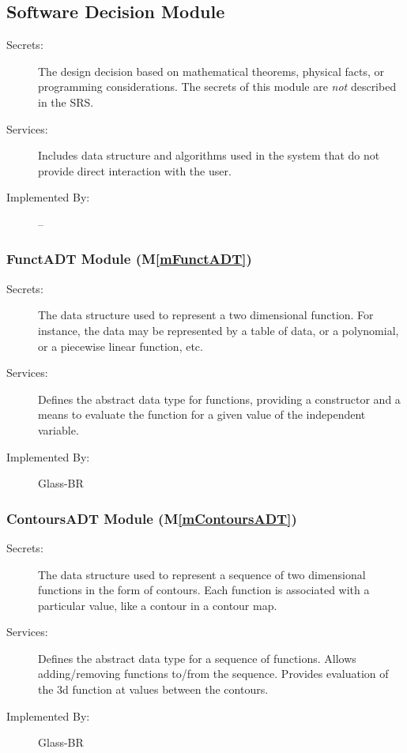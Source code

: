 \documentclass[12pt]{article}
\newcommand{\mref}[1]{M\ref{#1}}
\begin{document}
\subsection{Software Decision Module}

\begin{description}
\item[Secrets:] The design decision based on mathematical theorems, physical
  facts, or programming considerations. The secrets of this module are
  \emph{not} described in the SRS.
\item[Services:] Includes data structure and algorithms used in the system that
  do not provide direct interaction with the user. 
\item[Implemented By:] --
\end{description}

\subsubsection{FunctADT Module (\mref{mFunctADT})}

\begin{description}
\item[Secrets:] The data structure used to represent a two dimensional
  function.  For instance, the data may be represented by a table of data, or a
  polynomial, or a piecewise linear function, etc.
\item[Services:] Defines the abstract data type for functions, providing a
  constructor and a means to evaluate the function for a given value of the
  independent variable.
\item[Implemented By:] Glass-BR
\end{description}

\subsubsection{ContoursADT Module (\mref{mContoursADT})}

\begin{description}
\item[Secrets:] The data structure used to represent a
  sequence of two dimensional functions in the form of contours.  Each function
  is associated with a particular value, like a contour in a contour map.
\item[Services:] Defines the abstract data type for a sequence of functions.
  Allows adding/removing functions to/from the sequence.  Provides evaluation of
  the 3d function at values between the contours.
\item[Implemented By:] Glass-BR
\end{description}
\end{document}
